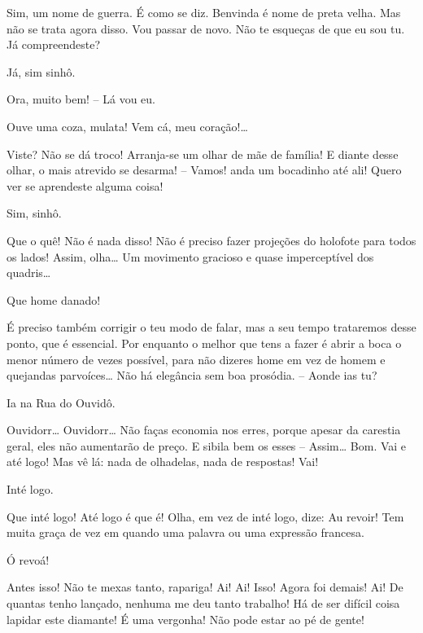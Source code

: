 Sim, um nome de guerra. É como se diz. Benvinda é nome de
preta velha. Mas não se trata agora disso. Vou passar de novo. Não te esqueças de
que eu sou tu. Já compreendeste?

 Já, sim sinhô.

 Ora, muito bem! -- Lá vou eu. 

  Ouve uma coza, mulata! Vem cá, meu
coração!\ldots{}

  Viste? Não se dá troco!
Arranja-se um olhar de mãe de família! E diante desse olhar, o mais atrevido se
desarma! -- Vamos! anda um bocadinho até ali! Quero ver se aprendeste alguma coisa!

 Sim, sinhô. 

 Que o quê! Não é nada disso! Não é preciso fazer projeções do
holofote para todos os lados! Assim, olha\ldots{}  Um movimento gracioso
e quase imperceptível dos quadris\ldots{}

  Que home danado!

 É preciso também corrigir o teu modo de falar, mas a seu tempo
trataremos desse ponto, que é essencial. Por enquanto o melhor que tens a
fazer é abrir a boca o menor número de vezes possível, para não dizeres home em vez
de homem e quejandas parvoíces\ldots{} Não há elegância sem boa prosódia. -- Aonde
ias tu?

 Ia na Rua do Ouvidô.

  Ouvidorr\ldots{} Ouvidorr\ldots{} Não faças economia nos
erres, porque apesar da carestia geral, eles não aumentarão de preço. E sibila bem
os esses -- Assim\ldots{} Bom. Vai e até logo! Mas vê lá: nada de olhadelas, nada de
respostas! Vai!

 Inté logo.

 Que inté logo! Até logo é que é! Olha, em vez de inté logo,
dize: Au revoir! Tem muita graça de vez em quando uma palavra ou uma expressão
francesa.

 Ó revoá!

 Antes isso!  Não te mexas tanto,
rapariga! Ai! Ai! Isso! Agora foi demais! Ai!  De quantas tenho
lançado, nenhuma me deu tanto trabalho! Há de ser difícil coisa lapidar este
diamante! É uma vergonha! Não pode estar ao pé de gente! 

